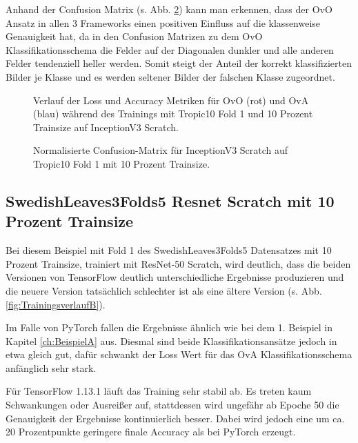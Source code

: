 Anhand der Confusion Matrix (s. Abb. \ref{fig:ConfusionMatrixA}) kann man erkennen, dass der OvO Ansatz in allen 3 Frameworks einen positiven Einfluss auf die klassenweise Genauigkeit hat, da in den Confusion Matrizen zu dem OvO Klassifikationsschema die Felder auf der Diagonalen dunkler und alle anderen Felder tendenziell heller werden. Somit steigt der Anteil der korrekt klassifizierten Bilder je Klasse und es werden seltener Bilder der falschen Klasse zugeordnet.
\begin{figure}[H]
\begin{adjustbox}{width=1.4\textwidth, center}

\end{adjustbox}
\caption{Verlauf der Loss und Accuracy Metriken für OvO (rot) und OvA (blau) während des Trainings mit Tropic10 Fold 1 und 10 Prozent Trainsize auf InceptionV3 Scratch.}
\label{fig:TrainingsverlaufA}
\end{figure}

\begin{figure}[H]
\begin{adjustbox}{width=1.1\textwidth, center}

\end{adjustbox}
\caption{Normalisierte Confusion-Matrix für InceptionV3 Scratch auf Tropic10 Fold 1 mit 10 Prozent Trainsize.}
\label{fig:ConfusionMatrixA}
\end{figure}

\subsection{SwedishLeaves3Folds5 Resnet Scratch mit 10 Prozent Trainsize}
\label{ch:BeispielB}
Bei diesem Beispiel mit Fold 1 des SwedishLeaves3Folds5 Datensatzes mit 10 Prozent Trainsize, trainiert mit ResNet-50 Scratch, wird deutlich, dass die beiden Versionen von TensorFlow \cite{tensorflow} deutlich unterschiedliche Ergebnisse produzieren und die neuere Version tatsächlich schlechter ist als eine ältere Version (s. Abb. \ref{fig:TrainingsverlaufB}).

Im Falle von PyTorch \cite{pytorch} fallen die Ergebnisse ähnlich wie bei dem 1. Beispiel in Kapitel \ref{ch:BeispielA} aus. Diesmal sind beide Klassifikationsansätze jedoch in etwa gleich gut, dafür schwankt der Loss Wert für das OvA Klassifikationsschema anfänglich sehr stark.

Für TensorFlow 1.13.1 \cite{tensorflow} läuft das Training sehr stabil ab. Es treten kaum Schwankungen oder Ausreißer auf, stattdessen wird ungefähr ab Epoche 50 die Genauigkeit der Ergebnisse kontinuierlich besser. Dabei wird jedoch eine um ca. 20 Prozentpunkte geringere finale Accuracy als bei PyTorch \cite{pytorch} erzeugt.

